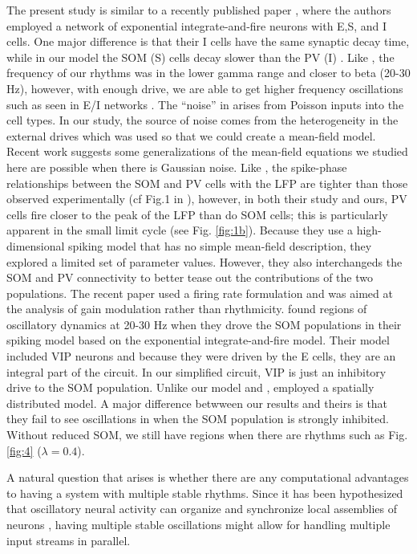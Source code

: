 \documentclass[10pt,letterpaper]{article}
\begin{document}
The present study is similar to a recently published paper \cite{FMM}, where the authors employed a network of exponential integrate-and-fire neurons with E,S, and I cells.  One major difference is that their I cells have the same synaptic decay time, while in our model the SOM (S) cells decay slower than the PV (I) \cite{edwards24}. Like \cite{FMM}, the frequency of our rhythms was in the lower gamma range and closer to beta (20-30 Hz), however, with enough drive, we are able to get higher frequency oscillations such as seen in E/I networks \cite{borgers05}. The ``noise'' in \cite{FMM} arises from Poisson inputs into the cell types. In our study, the source of noise comes from the heterogeneity in the external drives which was used so that we could create a mean-field model. Recent work \cite{goldobin21} suggests some generalizations of the mean-field equations we studied here are possible when there is Gaussian noise. Like \cite{FMM}, the spike-phase relationships between the SOM and PV cells with the LFP are tighter than those observed experimentally (cf Fig.1 in \cite{FMM}), however, in both their study and ours, PV cells fire closer to the peak of the LFP than do SOM cells; this is particularly apparent in the small limit cycle (see Fig. \ref{fig:1b}).  Because they use a high-dimensional spiking model that has no simple mean-field description, they explored a limited set of parameter values. However, they also interchangeds the SOM and PV connectivity to better tease out the contributions of the two populations. The recent paper \cite{bos20} used a firing rate formulation and was aimed at the analysis of gain modulation rather than rhythmicity. \cite{edwards24} found regions of oscillatory dynamics at 20-30 Hz when they drove the SOM populations in their spiking model based on the exponential integrate-and-fire model.  Their model included VIP neurons and because they were driven by the E cells, they are an integral part of the circuit.  In our simplified circuit, VIP is just an inhibitory drive to the SOM population.  Unlike our model and \cite{FMM}, \cite{edwards24} employed a spatially distributed model. A major difference betwween our results and theirs is that they fail to see oscillations in when the SOM population is strongly inhibited. Without reduced SOM, we still have regions when there are rhythms such as Fig. \ref{fig:4} ($\lambda=0.4$). 


A natural question that arises is whether there are any computational advantages to having a system with multiple stable rhythms. Since it has been hypothesized that oscillatory neural activity  can organize and synchronize local assemblies of neurons \cite{kopell11,bw12,fernandez}, having multiple stable oscillations might allow for handling multiple input streams in parallel. 
\end{document}
